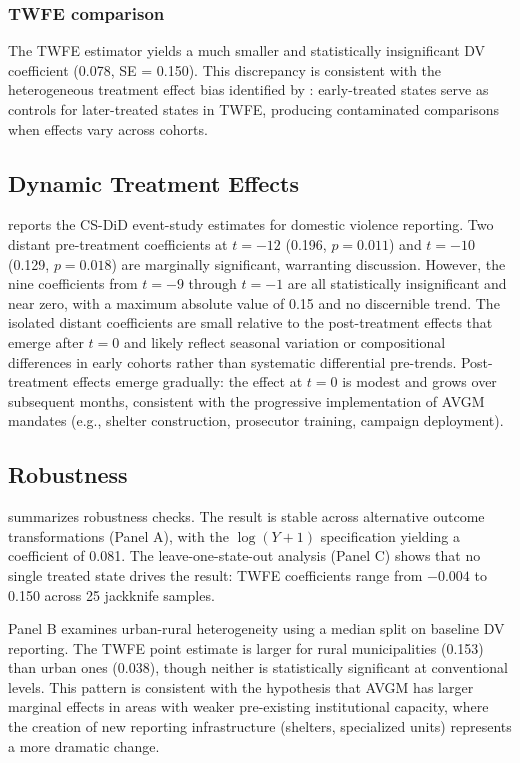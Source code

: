 \documentclass[12pt]{article}
\begin{document}
\subsubsection*{TWFE comparison} The TWFE estimator yields a much smaller and statistically insignificant DV coefficient (0.078, SE = 0.150). This discrepancy is consistent with the heterogeneous treatment effect bias identified by \citet{goodman_bacon2021}: early-treated states serve as controls for later-treated states in TWFE, producing contaminated comparisons when effects vary across cohorts.



\subsection{Dynamic Treatment Effects}

 reports the CS-DiD event-study estimates for domestic violence reporting. Two distant pre-treatment coefficients at $t = -12$ (0.196, $p = 0.011$) and $t = -10$ (0.129, $p = 0.018$) are marginally significant, warranting discussion. However, the nine coefficients from $t = -9$ through $t = -1$ are all statistically insignificant and near zero, with a maximum absolute value of 0.15 and no discernible trend. The isolated distant coefficients are small relative to the post-treatment effects that emerge after $t = 0$ and likely reflect seasonal variation or compositional differences in early cohorts rather than systematic differential pre-trends. Post-treatment effects emerge gradually: the effect at $t = 0$ is modest and grows over subsequent months, consistent with the progressive implementation of AVGM mandates (e.g., shelter construction, prosecutor training, campaign deployment).



\subsection{Robustness}

 summarizes robustness checks. The result is stable across alternative outcome transformations (Panel A), with the $\log(Y+1)$ specification yielding a coefficient of 0.081. The leave-one-state-out analysis (Panel C) shows that no single treated state drives the result: TWFE coefficients range from $-0.004$ to 0.150 across 25 jackknife samples.

Panel B examines urban-rural heterogeneity using a median split on baseline DV reporting. The TWFE point estimate is larger for rural municipalities (0.153) than urban ones (0.038), though neither is statistically significant at conventional levels. This pattern is consistent with the hypothesis that AVGM has larger marginal effects in areas with weaker pre-existing institutional capacity, where the creation of new reporting infrastructure (shelters, specialized units) represents a more dramatic change.
\end{document}
